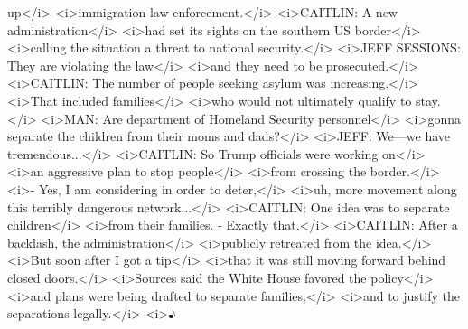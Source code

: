 \begin{itemize}
  up\textless{}/i\textgreater{} \textless{}i\textgreater{}immigration
  law enforcement.\textless{}/i\textgreater{}
  \textless{}i\textgreater{}CAITLIN: A new
  administration\textless{}/i\textgreater{}
  \textless{}i\textgreater{}had set its sights on the southern US
  border\textless{}/i\textgreater{} \textless{}i\textgreater{}calling
  the situation a threat to national
  security.\textless{}/i\textgreater{} \textless{}i\textgreater{}JEFF
  SESSIONS: They are violating the law\textless{}/i\textgreater{}
  \textless{}i\textgreater{}and they need to be
  prosecuted.\textless{}/i\textgreater{}
  \textless{}i\textgreater{}CAITLIN: The number of people seeking asylum
  was increasing.\textless{}/i\textgreater{}
  \textless{}i\textgreater{}That included
  families\textless{}/i\textgreater{} \textless{}i\textgreater{}who
  would not ultimately qualify to stay.\textless{}/i\textgreater{}
  \textless{}i\textgreater{}MAN: Are department of Homeland Security
  personnel\textless{}/i\textgreater{} \textless{}i\textgreater{}gonna
  separate the children from their moms and
  dads?\textless{}/i\textgreater{} \textless{}i\textgreater{}JEFF:
  We---we have tremendous...\textless{}/i\textgreater{}
  \textless{}i\textgreater{}CAITLIN: So Trump officials were working
  on\textless{}/i\textgreater{} \textless{}i\textgreater{}an aggressive
  plan to stop people\textless{}/i\textgreater{}
  \textless{}i\textgreater{}from crossing the
  border.\textless{}/i\textgreater{} \textless{}i\textgreater{}- Yes, I
  am considering in order to deter,\textless{}/i\textgreater{}
  \textless{}i\textgreater{}uh, more movement along this terribly
  dangerous network...\textless{}/i\textgreater{}
  \textless{}i\textgreater{}CAITLIN: One idea was to separate
  children\textless{}/i\textgreater{} \textless{}i\textgreater{}from
  their families. - Exactly that.\textless{}/i\textgreater{}
  \textless{}i\textgreater{}CAITLIN: After a backlash, the
  administration\textless{}/i\textgreater{}
  \textless{}i\textgreater{}publicly retreated from the
  idea.\textless{}/i\textgreater{} \textless{}i\textgreater{}But soon
  after I got a tip\textless{}/i\textgreater{}
  \textless{}i\textgreater{}that it was still moving forward behind
  closed doors.\textless{}/i\textgreater{}
  \textless{}i\textgreater{}Sources said the White House favored the
  policy\textless{}/i\textgreater{} \textless{}i\textgreater{}and plans
  were being drafted to separate families,\textless{}/i\textgreater{}
  \textless{}i\textgreater{}and to justify the separations
  legally.\textless{}/i\textgreater{} \textless{}i\textgreater{}♪

\end{itemize}
